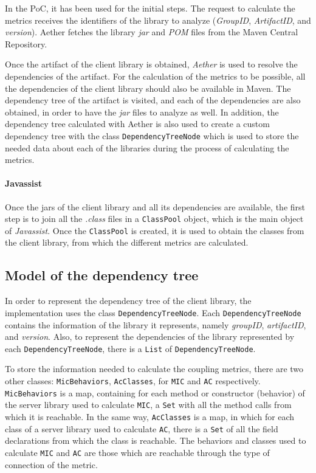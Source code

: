 In the PoC, it has been used for the initial steps. The request to calculate the metrics receives the identifiers of the library to analyze (\textit{GroupID}, \textit{ArtifactID}, and \textit{version}). Aether fetches the library \textit{jar} and \textit{POM} files from the Maven Central Repository.

Once the artifact of the client library is obtained, \textit{Aether} is used to resolve the dependencies of the artifact. For the calculation of the metrics to be possible, all the dependencies of the client library should also be available in Maven. The dependency tree of the artifact is visited, and each of the dependencies are also obtained, in order to have the \textit{jar} files to analyze as well. In addition, the dependency tree calculated with Aether is also used to create a custom dependency tree with the class \texttt{DependencyTreeNode} which is used to store the needed data about each of the libraries during the process of calculating the metrics.

\paragraph{Javassist}
Once the jars of the client library and all its dependencies are available, the first step is to join all the \textit{.class} files in a \texttt{ClassPool} object, which is the main object of \textit{Javassist}. Once the \texttt{ClassPool} is created, it is used to obtain the classes from the client library, from which the different metrics are calculated.

\subsection{Model of the dependency tree}
In order to represent the dependency tree of the client library, the implementation uses the class \texttt{DependencyTreeNode}. Each \texttt{DependencyTreeNode} contains the information of the library it represents, namely \textit{groupID}, \textit{artifactID}, and \textit{version}. Also, to represent the dependencies of the library represented by each  \texttt{DependencyTreeNode}, there is a \texttt{List} of \texttt{DependencyTreeNode}.

To store the information needed to calculate the coupling metrics, there are two other classes: \texttt{MicBehaviors}, \texttt{AcClasses}, for \texttt{MIC} and \texttt{AC} respectively. \texttt{MicBehaviors} is a map, containing for each method or constructor (behavior) of the server library used to calculate \texttt{MIC}, a \texttt{Set} with all the method calls from which it is reachable. In the same way, \texttt{AcClasses} is a map, in which for each class of a server library used to calculate \texttt{AC}, there is a \texttt{Set} of all the field declarations from which the class is reachable. The behaviors and classes used to calculate \texttt{MIC} and \texttt{AC} are those which are reachable through the type of connection of the metric.

